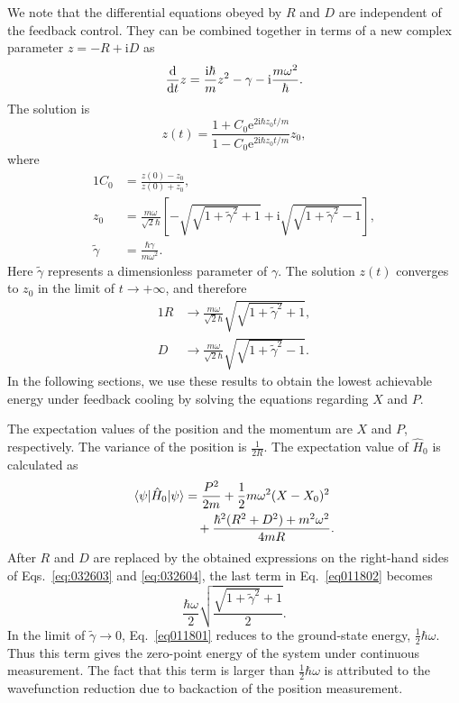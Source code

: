\documentclass[aps,pra,superscriptaddress,twocolumn
]{revtex4-2}
\newcommand{\e}{\mathrm{e}}
\renewcommand{\i}{\mathrm{i}}
\renewcommand{\d}{{\rm d}}
\begin{document}
 We note that the differential equations obeyed by $R$ and $D$ are independent of the feedback control.
 They can be combined together in terms of a new complex parameter $z = -R+\i D$ as 
 \begin{equation}
  \frac{\d}{\d t} z = \frac{\i \hbar}{m} z^2 - \gamma - \i \frac{m\omega^2}{\hbar}.
 \end{equation}
 The solution is 
 \begin{equation}
  z(t) = \frac{1+C_0 \e^{2\i\hbar z_0 t/m}}{1-C_0 \e^{2\i \hbar z_0 t/m}} z_0,
 \end{equation}
 where 
 \begin{alignat}{1}
  C_0 &= \frac{z(0)-z_0}{z(0)+z_0}, \\
  z_0 &= \frac{m\omega}{\sqrt{2}\hbar} 
  \left[ -
  \sqrt{\sqrt{1+\tilde \gamma^2} + 1}
  + \i \sqrt{\sqrt{1+\tilde \gamma^2} - 1}
  \right],\\
  \tilde \gamma &= \frac{\hbar\gamma}{m\omega^2}.
 \end{alignat}
 {Here $\tilde \gamma$ represents a dimensionless parameter 
 of $\gamma$.}
 The solution $z(t)$ converges to $z_0$ in the limit of $t \to +\infty$, 
 and therefore
 \begin{alignat}{1}
  R &\to \frac{m\omega}{\sqrt{2}\hbar} \sqrt{\sqrt{1+\tilde \gamma^2} + 1},\label{eq:032603} \\
  D &\to \frac{m\omega}{\sqrt{2}\hbar} \sqrt{\sqrt{1+\tilde \gamma^2} - 1}.\label{eq:032604}
 \end{alignat}
 In the following sections, we use these results to obtain the lowest achievable energy under feedback cooling 
 by solving the equations regarding $X$ and $P$.
 

 The expectation values of the position and the momentum are $X$ and $P$, respectively.
 The variance of the position is $\frac{1}{2R}$.
 The expectation value of $\hat H_0$ is calculated as
 \begin{alignat}{1}
  \langle \psi| \hat H_0 |\psi \rangle
   &= \frac{P^2}{2m}+\frac{1}{2}m\omega^2 (X-X_0)^2 \notag \\
   &\quad + \frac{\hbar^2(R^2+D^2) + m^2\omega^2}{4mR}. \label{eq011802}
 \end{alignat}
 After $R$ and $D$ are replaced by the obtained expressions on the right-hand sides 
 of Eqs.~\eqref{eq:032603} and \eqref{eq:032604}, 
 the last term in Eq.~\eqref{eq011802} becomes
 \begin{equation}
  \frac{\hbar\omega}{2} \sqrt{\frac{\sqrt{1+\tilde \gamma^2}+1}{2}}. \label{eq011801}
 \end{equation}
 In the limit of $\tilde \gamma \to 0$, 
 Eq.~\eqref{eq011801} reduces to the ground-state energy, $\frac{1}{2}\hbar\omega$.
 Thus this term gives the zero-point energy of the system under continuous measurement. 
 The fact that this term is larger than $\frac{1}{2}\hbar\omega$ is attributed 
 to the wavefunction reduction due to backaction of the position measurement.
\end{document}
